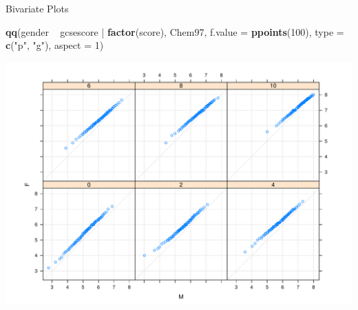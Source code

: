 \documentclass[ignorenonframetext,]{beamer}
\newenvironment{Shaded}{}{}
\newcommand{\KeywordTok}[1]{\textcolor[rgb]{0.00,0.44,0.13}{\textbf{{#1}}}}
\newcommand{\DataTypeTok}[1]{\textcolor[rgb]{0.56,0.13,0.00}{{#1}}}
\newcommand{\DecValTok}[1]{\textcolor[rgb]{0.25,0.63,0.44}{{#1}}}
\newcommand{\StringTok}[1]{\textcolor[rgb]{0.25,0.44,0.63}{{#1}}}
\newcommand{\NormalTok}[1]{{#1}}
\begin{document}
\begin{frame}[fragile]{Bivariate Plots}

\begin{Shaded}
\begin{Highlighting}[]
\KeywordTok{qq}\NormalTok{(gender ~}\StringTok{ }\NormalTok{gcsescore |}\StringTok{ }\KeywordTok{factor}\NormalTok{(score), Chem97,}
   \DataTypeTok{f.value =} \KeywordTok{ppoints}\NormalTok{(}\DecValTok{100}\NormalTok{), }\DataTypeTok{type =} \KeywordTok{c}\NormalTok{(}\StringTok{"p"}\NormalTok{, }\StringTok{"g"}\NormalTok{), }\DataTypeTok{aspect =} \DecValTok{1}\NormalTok{)}
\end{Highlighting}
\end{Shaded}

\includegraphics{R_intern_files/figure-beamer/unnamed-chunk-232-1.pdf}

\end{frame}
\end{document}
